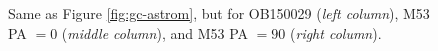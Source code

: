 \documentclass[]{spie}  %
\begin{document}
\begin{figure}[!h]
  \caption{\footnotesize Same as Figure \ref{fig:gc-astrom}, but for OB150029 (\textit{left column}), M53 PA $=0$ (\textit{middle column}), and M53 PA $=90$ (\textit{right column}).} \label{fig:ob-m53-astromfvu-ratios}
\end{figure}
\end{document}

